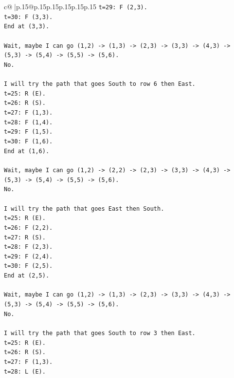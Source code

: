 \documentclass{article}
\begin{document}
{\begin{supertabular}{c@{$\;$}|p{.15\linewidth}@{}p{.15\linewidth}p{.15\linewidth}p{.15\linewidth}p{.15\linewidth}p{.15\linewidth}}
{{{\texttt{t=29: F (2,3).} \\
\texttt{t=30: F (3,3).} \\
\texttt{End at (3,3).} \\
\\ 
\texttt{Wait, maybe I can go (1,2) {-}> (1,3) {-}> (2,3) {-}> (3,3) {-}> (4,3) {-}> (5,3) {-}> (5,4) {-}> (5,5) {-}> (5,6).} \\
\texttt{No.} \\
\\ 
\texttt{I will try the path that goes South to row 6 then East.} \\
\texttt{t=25: R (E).} \\
\texttt{t=26: R (S).} \\
\texttt{t=27: F (1,3).} \\
\texttt{t=28: F (1,4).} \\
\texttt{t=29: F (1,5).} \\
\texttt{t=30: F (1,6).} \\
\texttt{End at (1,6).} \\
\\ 
\texttt{Wait, maybe I can go (1,2) {-}> (2,2) {-}> (2,3) {-}> (3,3) {-}> (4,3) {-}> (5,3) {-}> (5,4) {-}> (5,5) {-}> (5,6).} \\
\texttt{No.} \\
\\ 
\texttt{I will try the path that goes East then South.} \\
\texttt{t=25: R (E).} \\
\texttt{t=26: F (2,2).} \\
\texttt{t=27: R (S).} \\
\texttt{t=28: F (2,3).} \\
\texttt{t=29: F (2,4).} \\
\texttt{t=30: F (2,5).} \\
\texttt{End at (2,5).} \\
\\ 
\texttt{Wait, maybe I can go (1,2) {-}> (1,3) {-}> (2,3) {-}> (3,3) {-}> (4,3) {-}> (5,3) {-}> (5,4) {-}> (5,5) {-}> (5,6).} \\
\texttt{No.} \\
\\ 
\texttt{I will try the path that goes South to row 3 then East.} \\
\texttt{t=25: R (E).} \\
\texttt{t=26: R (S).} \\
\texttt{t=27: F (1,3).} \\
\texttt{t=28: L (E).} \\
}}}
\end{supertabular}}
\end{document}
